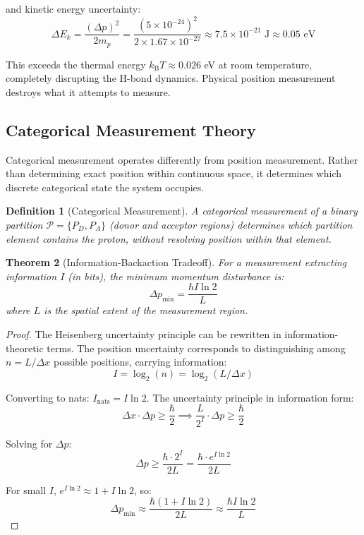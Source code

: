 \documentclass[twocolumn,10pt]{article}
\newtheorem{theorem}{Theorem}[section]
\newtheorem{definition}[theorem]{Definition}
\theoremstyle{remark}
\newcommand{\kB}{k_{\mathrm{B}}}
\begin{document}
and kinetic energy uncertainty:
\begin{equation}
\Delta E_k = \frac{(\Delta p)^2}{2m_p} = \frac{(5 \times 10^{-24})^2}{2 \times 1.67 \times 10^{-27}} \approx 7.5 \times 10^{-21} \text{ J} \approx 0.05 \text{ eV}
\end{equation}

This exceeds the thermal energy $\kB T \approx 0.026$ eV at room temperature, completely disrupting the H-bond dynamics. Physical position measurement destroys what it attempts to measure.

\subsection{Categorical Measurement Theory}

Categorical measurement operates differently from position measurement. Rather than determining exact position within continuous space, it determines which discrete categorical state the system occupies.

\begin{definition}[Categorical Measurement]
A categorical measurement of a binary partition $\mathcal{P} = \{P_D, P_A\}$ (donor and acceptor regions) determines which partition element contains the proton, without resolving position within that element.
\end{definition}

\begin{theorem}[Information-Backaction Tradeoff]
\label{thm:info_backaction}
For a measurement extracting information $I$ (in bits), the minimum momentum disturbance is:
\begin{equation}
\Delta p_{\min} = \frac{\hbar I \ln 2}{L}
\end{equation}
where $L$ is the spatial extent of the measurement region.
\end{theorem}

\begin{proof}
The Heisenberg uncertainty principle can be rewritten in information-theoretic terms. The position uncertainty corresponds to distinguishing among $n = L/\Delta x$ possible positions, carrying information:
\begin{equation}
I = \log_2(n) = \log_2(L/\Delta x)
\end{equation}

Converting to nats: $I_{\mathrm{nats}} = I \ln 2$. The uncertainty principle in information form:
\begin{equation}
\Delta x \cdot \Delta p \geq \frac{\hbar}{2} \implies \frac{L}{2^I} \cdot \Delta p \geq \frac{\hbar}{2}
\end{equation}

Solving for $\Delta p$:
\begin{equation}
\Delta p \geq \frac{\hbar \cdot 2^I}{2L} = \frac{\hbar \cdot e^{I \ln 2}}{2L}
\end{equation}

For small $I$, $e^{I \ln 2} \approx 1 + I \ln 2$, so:
\begin{equation}
\Delta p_{\min} \approx \frac{\hbar(1 + I \ln 2)}{2L} \approx \frac{\hbar I \ln 2}{L}
\end{equation}
\end{proof}
\end{document}
